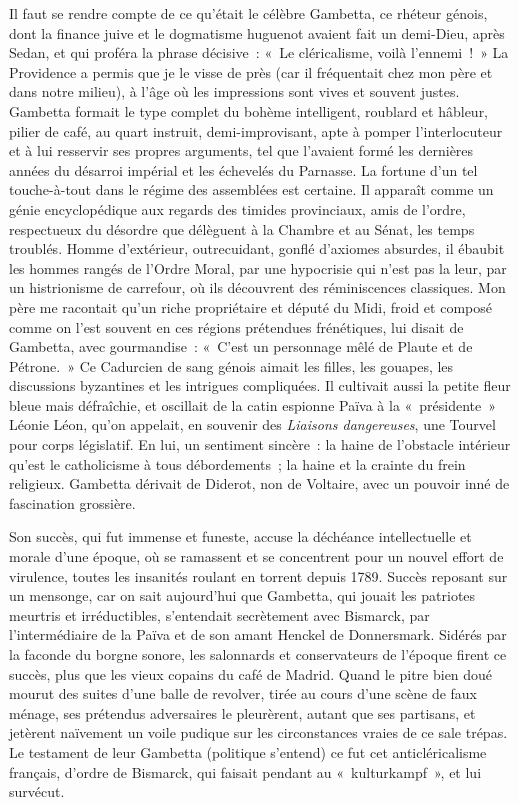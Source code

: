 \documentclass[french,twoside]{book} %
\begin{document}
Il faut se rendre compte de ce qu’était le célèbre Gambetta, ce rhéteur génois, dont la finance juive et le dogmatisme huguenot avaient fait un demi-Dieu, après Sedan, et qui proféra la phrase décisive : « Le cléricalisme, voilà l’ennemi ! » La Providence a permis que je le visse de près (car il fréquentait chez mon père et dans notre milieu), à l’âge où les impressions sont vives et souvent justes. Gambetta formait le type complet du bohème intelligent, roublard et hâbleur, pilier de café, au quart instruit, demi-improvisant, apte à pomper l’interlocuteur et à lui resservir ses propres arguments, tel que l’avaient formé les dernières années du désarroi impérial et les échevelés du Parnasse. La fortune d’un tel touche-à-tout dans le régime des assemblées est certaine. Il apparaît comme un génie encyclopédique aux regards des timides provinciaux, amis de l’ordre, respectueux du désordre que délèguent à la Chambre et au Sénat, les temps troublés. Homme d’extérieur, outrecuidant, gonflé d’axiomes absurdes, il ébaubit les hommes rangés de l’Ordre Moral, par une hypocrisie qui n’est pas la leur, par un histrionisme de carrefour, où ils découvrent des réminiscences classiques. Mon père me racontait qu’un riche propriétaire et député du Midi, froid et composé comme on l’est souvent en ces régions prétendues frénétiques, lui disait de Gambetta, avec gourmandise : « C’est un personnage mêlé de Plaute et de Pétrone. » Ce Cadurcien de sang génois aimait les filles, les gouapes, les discussions byzantines et les intrigues compliquées. Il cultivait aussi la petite fleur bleue mais défraîchie, et oscillait de la catin espionne Païva à la « présidente » Léonie Léon, qu’on appelait, en souvenir des {\itshape Liaisons dangereuses}, une Tourvel pour corps législatif. En lui, un sentiment sincère : la haine de l’obstacle intérieur qu’est le catholicisme à tous débordements ; la haine et la crainte du frein religieux. Gambetta dérivait de Diderot, non de Voltaire, avec un pouvoir inné de fascination grossière.\par
Son succès, qui fut immense et funeste, accuse la déchéance intellectuelle et morale d’une époque, où se ramassent et se concentrent pour un nouvel effort de virulence, toutes les insanités roulant en torrent depuis 1789. Succès reposant sur un mensonge, car on sait aujourd’hui que Gambetta, qui jouait les patriotes meurtris et irréductibles, s’entendait secrètement avec Bismarck, par l’intermédiaire de la Païva et de son amant Henckel de Donnersmark. Sidérés par la faconde du borgne sonore, les salonnards et conservateurs de l’époque firent ce succès, plus que les vieux copains du café de Madrid. Quand le pitre bien doué mourut des suites d’une balle de revolver, tirée au cours d’une scène de faux ménage, ses prétendus adversaires le pleurèrent, autant que ses partisans, et jetèrent naïvement un voile pudique sur les circonstances vraies de ce sale trépas. Le testament de leur Gambetta (politique s’entend) ce fut cet anticléricalisme français, d’ordre de Bismarck, qui faisait pendant au « kulturkampf », et lui survécut.\par
\end{document}
